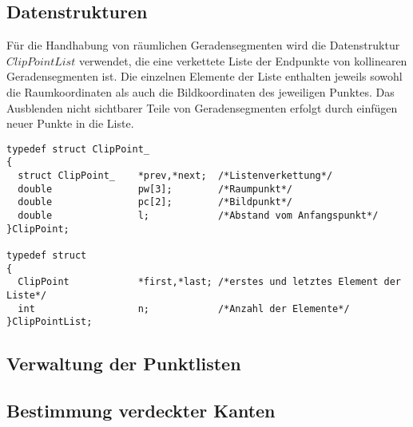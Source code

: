 
\subsection{Datenstrukturen}

Für die Handhabung von räumlichen Geradensegmenten wird die Datenstruktur
$ClipPointList$ verwendet, die eine verkettete Liste der Endpunkte von
kollinearen Geradensegmenten ist. Die einzelnen Elemente der Liste enthalten
jeweils sowohl die Raumkoordinaten als auch die Bildkoordinaten des jeweiligen
Punktes. Das Ausblenden nicht sichtbarer Teile von Geradensegmenten erfolgt
durch einfügen neuer Punkte in die Liste.
\begprogr\begin{verbatim}
typedef struct ClipPoint_
{
  struct ClipPoint_    *prev,*next;  /*Listenverkettung*/
  double               pw[3];        /*Raumpunkt*/
  double               pc[2];        /*Bildpunkt*/
  double               l;            /*Abstand vom Anfangspunkt*/
}ClipPoint;

typedef struct
{
  ClipPoint            *first,*last; /*erstes und letztes Element der Liste*/
  int                  n;            /*Anzahl der Elemente*/
}ClipPointList;
\end{verbatim}\endprogr


\subsection{Verwaltung der Punktlisten}



\subsection{Bestimmung verdeckter Kanten}

